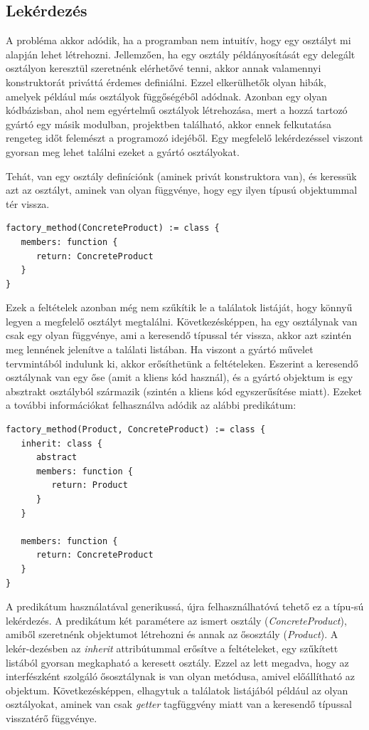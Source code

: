 \documentclass[a4paper,12pt]{report}
\begin{document}
\subsection{Lekérdezés}
A probléma akkor adódik, ha a programban nem intuitív, hogy egy osztályt mi alapján lehet létrehozni. Jellemzően, ha egy osztály példányosítását egy delegált osztályon keresztül szeretnénk elérhetővé tenni, akkor annak valamennyi konstruktorát priváttá érdemes definiálni. Ezzel elkerülhetők olyan hibák, amelyek például más osztályok függőségéből adódnak. Azonban egy olyan kódbázisban, ahol nem egyértelmű osztályok létrehozása, mert a hozzá tartozó gyártó egy másik modulban, projektben található, akkor ennek felkutatása rengeteg időt felemészt a programozó idejéből. Egy megfelelő lekérdezéssel viszont gyorsan meg lehet találni ezeket a gyártó osztályokat.
\par  Tehát, van egy osztály definíciónk (aminek privát konstruktora van), és keressük azt az osztályt, aminek van olyan függvénye, hogy egy ilyen típusú objektummal tér vissza. 
\begin{verbatim}
factory_method(ConcreteProduct) := class {
   members: function {
      return: ConcreteProduct
   }
}
\end{verbatim}
\par Ezek a feltételek azonban még nem szűkítik le a találatok listáját, hogy könnyű legyen a megfelelő osztályt megtalálni. Következésképpen, ha egy osztálynak van csak egy olyan függvénye, ami a keresendő típussal tér vissza, akkor azt szintén meg lennének jelenítve a találati listában. Ha viszont a gyártó művelet tervmintából indulunk ki, akkor erősíthetünk a feltételeken. Eszerint a keresendő osztálynak van egy őse (amit a kliens kód használ), és a gyártó objektum is egy absztrakt osztályból származik (szintén a kliens kód egyszerűsítése miatt). Ezeket a további információkat felhasználva adódik az alábbi predikátum:
\begin{verbatim}
factory_method(Product, ConcreteProduct) := class {
   inherit: class {
      abstract
      members: function { 
         return: Product 
      }
   }

   members: function {
      return: ConcreteProduct
   }
}
\end{verbatim}
\par A predikátum használatával generikussá, újra felhasználhatóvá tehető ez a típu-sú lekérdezés. A predikátum két paramétere az ismert osztály (\textit{ConcreteProduct}), amiből szeretnénk objektumot létrehozni és annak az ősosztály (\textit{Product}). A lekér-dezésben az \textit{inherit} attribútummal erősítve a feltételeket, egy szűkített listából gyorsan megkapható a keresett osztály. Ezzel az lett megadva, hogy az interfészként szolgáló ősosztálynak is van olyan metódusa, amivel előállítható az objektum. Következésképpen, elhagytuk a találatok listájából például az olyan osztályokat, aminek van csak \textit{getter} tagfüggvény miatt van a keresendő típussal visszatérő függvénye.
\end{document}

